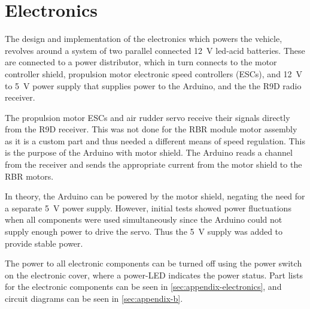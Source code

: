 \section{Electronics}

The design and implementation of the electronics which powers the vehicle, revolves around a system of two parallel connected 12~V led-acid batteries. These are connected to a power distributor, which in turn connects to the motor controller shield, propulsion
motor electronic speed controllers (ESCs), 
and 12~V to 5~V power supply that supplies power to the Arduino, and the the R9D radio receiver.

The propulsion motor ESCs and air rudder servo receive their signals directly from the R9D receiver. This was not done for the RBR module motor assembly as it is a custom part and thus needed a different means of speed regulation. This is the purpose of the Arduino with motor shield. The Arduino reads a channel from the receiver and sends the appropriate current from the motor shield to the RBR motors.

In theory, the Arduino can be powered by the motor shield, negating the need for a separate 5~V power supply.
However, initial tests showed power fluctuations when all components were used simultaneously since the Arduino could not supply enough power to drive the servo. 
Thus the 5~V supply was added to provide stable power.

The power to all electronic components can be turned off using the power switch on the electronic cover, where a power-LED indicates the power status.  Part lists for the electronic components can be seen in \cref{sec:appendix-electronics},
and circuit diagrams can be seen in \cref{sec:appendix-b}.

